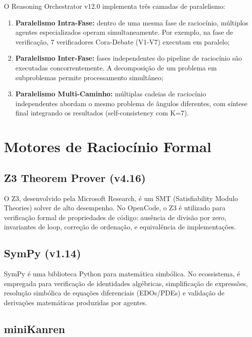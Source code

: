 \documentclass[12pt,a4paper,sumario=tradicional]{abntex2}
\begin{document}
O Reasoning Orchestrator v12.0 implementa três camadas de paralelismo:

\begin{enumerate}
    \item \textbf{Paralelismo Intra-Fase:} dentro de uma mesma fase de raciocínio, múltiplos agentes especializados operam simultaneamente. Por exemplo, na fase de verificação, 7 verificadores Cora-Debate (V1-V7) executam em paralelo;
    \item \textbf{Paralelismo Inter-Fase:} fases independentes do pipeline de raciocínio são executadas concorrentemente. A decomposição de um problema em subproblemas permite processamento simultâneo;
    \item \textbf{Paralelismo Multi-Caminho:} múltiplas cadeias de raciocínio independentes abordam o mesmo problema de ângulos diferentes, com síntese final integrando os resultados (self-consistency com K=7).
\end{enumerate}

\section{Motores de Raciocínio Formal}

\subsection{Z3 Theorem Prover (v4.16)}

O Z3, desenvolvido pela Microsoft Research, é um SMT (Satisfiability Modulo Theories) solver de alto desempenho. No OpenCode, o Z3 é utilizado para verificação formal de propriedades de código: ausência de divisão por zero, invariantes de loop, correção de ordenação, e equivalência de implementações.

\subsection{SymPy (v1.14)}

SymPy é uma biblioteca Python para matemática simbólica. No ecossistema, é empregada para verificação de identidades algébricas, simplificação de expressões, resolução simbólica de equações diferenciais (EDOs/PDEs) e validação de derivações matemáticas produzidas por agentes.

\subsection{miniKanren}
\end{document}
